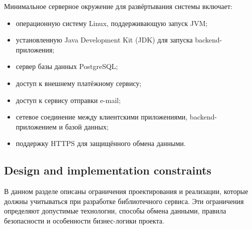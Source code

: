\documentclass[12pt,a4paper]{article}
\begin{document}
	Минимальное серверное окружение для развёртывания системы включает:
	
	\begin{itemize}
		\item операционную систему Linux, поддерживающую запуск JVM;
		\item установленную Java Development Kit (JDK) для запуска backend-приложения;
		\item сервер базы данных PostgreSQL;
		\item доступ к внешнему платёжному сервису;
		\item доступ к сервису отправки e-mail;
		\item сетевое соединение между клиентскими приложениями, backend-приложением и базой данных;
		\item поддержку HTTPS для защищённого обмена данными.
	\end{itemize}
	
	\subsection{Design and implementation constraints}
	
	В данном разделе описаны ограничения проектирования и реализации, которые должны
	учитываться при разработке библиотечного сервиса. Эти ограничения определяют
	допустимые технологии, способы обмена данными, правила безопасности и особенности
	бизнес-логики проекта.
	
\end{document}
